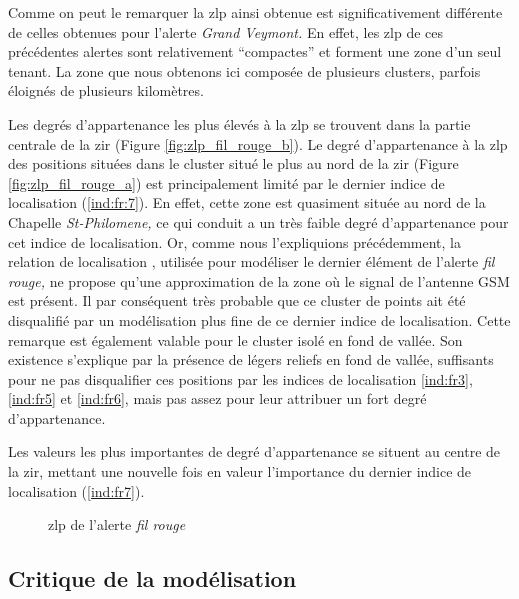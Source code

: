 Comme on peut le remarquer la \ac{zlp} ainsi obtenue est
significativement différente de celles obtenues pour l'alerte
\emph{Grand Veymont.} En effet, les \ac{zlp} de ces précédentes
alertes sont relativement \enquote{compactes} et forment une zone d'un
seul tenant. La zone que nous obtenons ici composée de plusieurs
clusters, parfois éloignés de plusieurs kilomètres.

Les degrés d'appartenance les plus élevés à la \ac{zlp} se trouvent
dans la partie centrale de la \ac{zir} (Figure
\ref{fig:zlp_fil_rouge_b}).  Le degré d'appartenance à la \ac{zlp} des
positions situées dans le cluster situé le plus au nord de la \ac{zir}
(Figure \ref{fig:zlp_fil_rouge_a}) est principalement limité par le
dernier indice de localisation (\ref{ind:fr:7}). En effet, cette zone
est quasiment située au nord de la Chapelle \emph{St-Philomene,} ce
qui conduit a un très faible degré d’appartenance pour cet indice de
localisation. Or, comme nous l'expliquions précédemment, la relation
de localisation , utilisée pour modéliser le
dernier élément de l'alerte \emph{fil rouge,} ne propose qu'une
approximation de la zone où le signal de l'antenne GSM est présent. Il
par conséquent très probable que ce cluster de points ait été
disqualifié par un modélisation plus fine de ce dernier indice de
localisation. Cette remarque est également valable pour le cluster
isolé en fond de vallée. Son existence s'explique par la présence de
légers reliefs en fond de vallée, suffisants pour ne pas disqualifier
ces positions par les indices de localisation \ref{ind:fr3},
\ref{ind:fr5} et \ref{ind:fr6}, mais pas assez pour leur attribuer un
fort degré d'appartenance.

Les valeurs les plus importantes de degré d'appartenance se situent au
centre de la \ac{zir}, mettant une nouvelle fois en valeur
l'importance du dernier indice de localisation (\ref{ind:fr7}).

\begin{figure}
  \centering
  
  \caption{\ac{zlp} de l'alerte \emph{fil rouge}}
  \label{fig:zlp_fil_rouge}
\end{figure}

\subsection{Critique de la modélisation}
\label{subsec:9-4-3}

